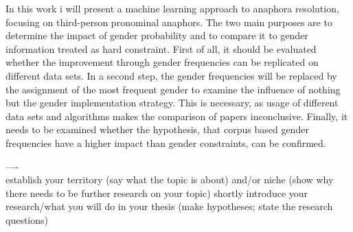 In this work i will present a machine learning approach to anaphora resolution, focusing on third-person pronominal anaphors. The two main purposes are to determine the impact of gender probability and to compare it to gender information treated as hard constraint. First of all, it should be evaluated whether the improvement through gender frequencies can be replicated on different data sets. In a second step, the gender frequencies will be replaced by the assignment of the most frequent gender to examine the influence of nothing but the gender implementation strategy. This is necessary, as usage of different data sets and algorithms makes the comparison of papers inconclusive. Finally, it needs to be examined whether the hypothesis, that corpus based gender frequencies have a higher impact than gender constraints, can be confirmed.




----\\
establish your territory (say what the topic is about) and/or niche (show why there needs to be further research on your topic)
shortly introduce your research/what you will do in your thesis (make hypotheses; state the research questions)


